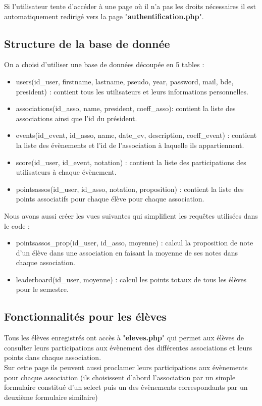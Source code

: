 \documentclass[french]{article}
\begin{document}
 Si l'utilisateur tente d'accéder à une page où il n'a pas les droits nécessaires il est automatiquement redirigé vers la page "\textbf{authentification.php}". 
 \subsection{Structure de la base de donnée}
 On a choisi d'utiliser une base de données découpée en 5 tables : \\
 \begin{itemize}
 	\item users(id\_user, firstname, lastname, pseudo, year, password, mail, bde, president) : contient tous les utilisateurs et leurs informations personnelles.
 	\item associations(id\_asso, name, president, coeff\_asso): contient la liste des associations ainsi que l'id du président.
 	\item events(id\_event, id\_asso, name, date\_ev, description, coeff\_event) : contient la liste des évènements et l'id de l'association à laquelle ils appartiennent.
 	\item score(id\_user, id\_event, notation) : contient la liste des participations des utilisateurs à chaque évènement.
 	\item pointsassos(id\_user, id\_asso, notation, proposition) : contient la liste des points associatifs pour chaque élève pour chaque association.\\
 \end{itemize} 

Nous avons aussi créer les vues suivantes qui simplifient les requêtes utilisées dans le code : \\
\begin{itemize}
	\item pointsassos\_prop(id\_user, id\_asso, moyenne) : calcul la proposition de note d'un élève dans une association en faisant la moyenne de ses notes dans chaque association.
	\item leaderboard(id\_user, moyenne) : calcul les points totaux de tous les élèves pour le semestre.
\end{itemize}
\subsection{Fonctionnalités pour les élèves}
	Tous les élèves enregistrés ont accès à "\textbf{eleves.php}" qui permet aux élèves de consulter leurs participations aux évènement des différentes associations et leurs points dans chaque association. \\
	Sur cette page ils peuvent aussi proclamer leurs participations aux évènements pour chaque association (ils choisissent d'abord l'association par un simple formulaire constitué d'un select puis un des évènements correspondants par un deuxième formulaire similaire)\\
	
\end{document}
